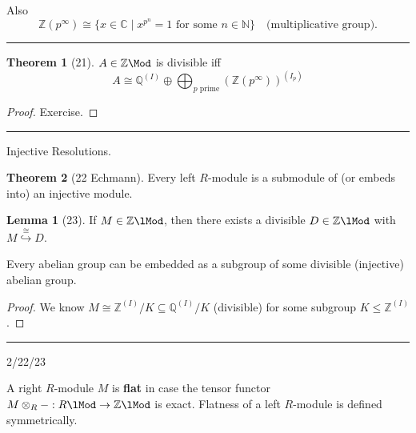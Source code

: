 \documentclass[12pt]{article}
\newcommand{\keyword}[1]{\textbf{#1}}
\newcommand{\sepline}{\rule{\textwidth}{0.4pt}}
\theoremstyle{definition}
\newtheorem{theorem}{Theorem}
\newtheorem{lemma}{Lemma}
\newcommand{\N}{\mathbb{N}}
\newcommand{\Z}{\mathbb{Z}}
\newcommand{\Q}{\mathbb{Q}}
\newcommand{\C}{\mathbb{C}}
\newcommand{\<}{\left\langle}
\renewcommand{\>}{\right\rangle}
\newcommand{\iso}{\cong}
\newcommand{\seq}{\subseteq}
\newcommand{\tensor}{\otimes}
\newcommand{\inc}{\hookrightarrow}
\renewcommand{\_}[1]{{_{#1}}}
\begin{document}
Also
\[
    \Z(p^\infty) \iso \{x \in \C \mid x^{p^n} = 1 \text{ for some } n \in \N\}
    \quad\text{(multiplicative group)}.
\]

\sepline

\begin{theorem}[21]
    $A \in \Z\Mod$ is divisible iff
    \[
        A \iso \Q^{(I)} \oplus \bigoplus_{p\text{ prime}} (\Z(p^\infty))^{(I_p)}
    \]
\end{theorem}

\begin{proof}
    Exercise.
\end{proof}

\sepline

Injective Resolutions.

\begin{theorem}[22 Echmann]
    Every left $R$-module is a submodule of (or embeds into) an injective module.
\end{theorem}

\begin{lemma}[23]
    If $M \in \Z\lMod$, then there exists a divisible $D \in \Z\lMod$ with $M \overset{\iso}{\inc} D$.

    Every abelian group can be embedded as a subgroup of some divisible (injective) abelian group.
\end{lemma}

\begin{proof}
    We know $M \iso \Z^{(I)}/K \seq \Q^{(I)}/K$ (divisible) for some subgroup $K \leq \Z^{(I)}$.
\end{proof}


\sepline

2/22/23

A right $R$-module $M$ is \keyword{flat} in case the tensor functor $M \tensor_R - : R\lMod \to \Z\lMod$ is exact.
Flatness of a left $R$-module is defined symmetrically.
\end{document}
